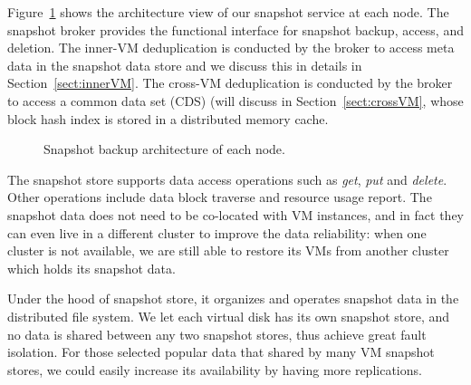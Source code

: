 Figure~\ref{fig:arch} shows the architecture view of our snapshot service
at each node. The snapshot broker provides the functional interface for  snapshot backup, access, and deletion.
The inner-VM  deduplication is conducted by the broker to access meta data in the snapshot data store
and we discuss this in details in Section~\ref{sect:innerVM}.
The cross-VM deduplication is conducted by the broker to access 
a common data set (CDS) (will discuss in Section~\ref{sect:crossVM},
whose block hash index is stored in a distributed memory cache. 
\begin{figure}[htbp]
  \centering
  \caption{Snapshot backup architecture of each node.}
  \label{fig:arch}
\end{figure}
The snapshot store 
supports data access operations such as \emph{get}, \emph{put} and \emph{delete}.
Other operations include data block traverse and resource usage report.
The snapshot data does not need to be
co-located with VM instances, and in fact they can even live in a different cluster to improve the 
data reliability: when one cluster is not available, we are still able to restore its VMs from another cluster which
holds its snapshot data. 

Under the hood of snapshot store, it organizes and operates snapshot data 
in the distributed file system. We let each virtual disk has its own snapshot store, 
and no data is shared between
any two snapshot stores, thus achieve great fault isolation. For those selected popular data
that shared by many VM snapshot stores, we could easily increase its availability by having more replications.


